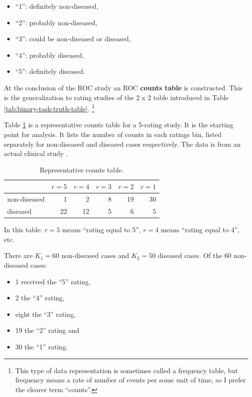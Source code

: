 \documentclass[
]{book}
\providecommand{\tightlist}{%
  \setlength{\itemsep}{0pt}\setlength{\parskip}{0pt}}
\begin{document}
\begin{itemize}
\tightlist
\item
  ``1'': definitely non-diseased,
\item
  ``2'': probably non-diseased,
\item
  ``3'': could be non-diseased or diseased,
\item
  ``4'': probably diseased,
\item
  ``5'': definitely diseased.
\end{itemize}

At the conclusion of the ROC study an ROC \textbf{counts table} is constructed. This is the generalization to rating studies of the 2 x 2 table introduced in Table \ref{tab:binary-task-truth-table}. \footnote{This type of data representation is sometimes called a frequency table, but frequency means a rate of number of events per some unit of time, so I prefer the clearer term ``counts''.}

Table \ref{tab:ratings-paradigm-example-table} is a representative counts table for a 5-rating study. It is the starting point for analysis. It lists the number of counts in each ratings bin, listed separately for non-diseased and diseased cases respectively. The data is from an actual clinical study \citep{barnes1989comparison}.

\begin{table}

\caption{\label{tab:ratings-paradigm-example-table}Representative counts table.}
\centering
\begin{tabular}[t]{l|r|r|r|r|r}
\hline
  & $r = 5$ & $r = 4$ & $r = 3$ & $r = 2$ & $r = 1$\\
\hline
non-diseased & 1 & 2 & 8 & 19 & 30\\
\hline
diseased & 22 & 12 & 5 & 6 & 5\\
\hline
\end{tabular}
\end{table}

In this table: \(r = 5\) means ``rating equal to 5'', \(r = 4\) means ``rating equal to 4'', etc.

There are \(K_1 = 60\) non-diseased cases and \(K_2 = 50\) diseased cases. Of the 60 non-diseased cases:

\begin{itemize}
\tightlist
\item
  1 received the ``5'' rating,
\item
  2 the ``4'' rating,
\item
  eight the ``3'' rating,
\item
  19 the ``2'' rating and
\item
  30 the ``1'' rating.
\end{itemize}
\end{document}
